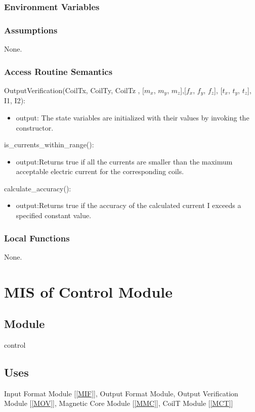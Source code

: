 \documentclass[12pt, titlepage]{article}
\begin{document}
\subsubsection{Environment Variables}

\subsubsection{Assumptions}
None.

\subsubsection{Access Routine Semantics}
\noindent OutputVerification(CoilTx,  CoilTy,  CoilTz , [$m_x$, $m_y$, $m_z$],[$f_x$, $f_y$, $f_z$], [$t_x$, $t_y$, $t_z$], I1, I2):
\begin{itemize}
\item output: The state variables are initialized with their values by invoking the constructor.
\end{itemize}

\noindent is\_currents\_within\_range():
\begin{itemize}
\item output:Returns true if all the currents are smaller than the maximum acceptable electric current for the corresponding coils.
\end{itemize}

\noindent calculate\_accuracy():
\begin{itemize}
\item output:Returns true if the accuracy of the calculated current I exceeds a specified constant value.
\end{itemize}
\subsubsection{Local Functions}
None.


\section{MIS of Control Module} \label{Mc}

\subsection{Module}
control

\subsection{Uses}
Input Format Module [\ref{MIF}], Output Format Module, Output Verification Module [\ref{MOV}], Magnetic Core Module [\ref{MMC}], CoilT Module [\ref{MCT}]
\end{document}

